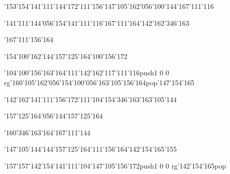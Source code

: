 \null\vfill\ipa\centerline{\enskip\char'153\char'154\char'141\char'111\char'144\char'172\enskip\char'111\char'156\enskip\char'147\char'105\char'162\char'056\char'100\char'144\enskip\enskip\enskip\enskip\enskip\enskip\enskip\char'167\char'111\char'116}\medskip\centerline{\enskip\char'141\char'111\char'144\char'056\char'154\char'141\char'111\char'116\enskip\enskip\enskip\enskip\char'167\char'111\char'164\enskip\enskip\enskip\enskip\enskip\char'142\char'162\char'346\char'163}\medskip\centerline{\enskip\enskip\enskip\enskip\enskip\enskip\enskip\enskip\char'167\char'111\char'156\char'164\enskip\enskip\enskip\enskip\enskip\enskip}\medskip\centerline{\enskip\enskip\enskip\enskip\enskip\enskip\enskip\enskip\char'154\char'100\char'162\enskip\char'144\char'157\char'125\char'164\enskip\char'100\char'156\char'172\enskip\enskip\enskip\enskip\enskip}\medskip\centerline{\enskip\enskip\char'104\char'100\char'156\char'163\char'164\enskip\char'111\enskip\char'142\char'162\char'117\char'111\char'116\enskip\pdfcolorstack\match push{1 0 0 rg}\char'160\char'105\char'162\char'056\char'154\char'100\char'056\char'163\char'105\char'156\char'164\pdfcolorstack\match pop{}\enskip\char'147\char'154\char'165}\medskip\vfill\footline{\hfil\tt\folio\hfil}\eject
\null\vfill\ipa\centerline{\enskip\char'142\char'162\char'141\char'111\char'156\char'172\enskip\enskip\enskip\enskip\enskip\enskip\enskip\char'111\char'104\enskip\enskip\enskip\char'154\char'346\char'163\enskip\char'163\char'105\char'144}\medskip\centerline{\enskip\char'157\char'125\char'164\char'056\char'144\char'157\char'125\char'164\enskip\enskip\enskip\enskip\enskip\enskip\enskip\enskip\enskip\enskip\enskip\enskip\enskip\enskip\enskip}\medskip\centerline{\enskip\enskip\enskip\enskip\enskip\enskip\enskip\enskip\char'160\char'346\char'163\char'164\enskip\enskip\enskip\char'167\char'111\char'144}\medskip\centerline{\enskip\enskip\enskip\enskip\enskip\enskip\enskip\enskip\char'147\char'105\char'144\enskip\char'144\char'157\char'125\char'164\enskip\char'111\char'156\char'164\enskip\char'142\char'154\char'165\char'155}\medskip\centerline{\enskip\char'157\enskip\enskip\enskip\enskip\enskip\enskip\enskip\char'157\enskip\char'142\char'154\char'141\char'111\char'104\enskip\enskip\enskip\enskip\enskip\enskip\char'147\char'105\char'156\char'172\enskip\pdfcolorstack\match push{1 0 0 rg}\char'142\char'154\char'165\pdfcolorstack\match pop{}}\medskip\vfill\footline{\hfil\tt\folio\hfil}\eject\bye